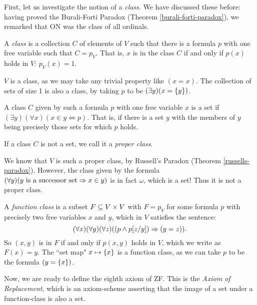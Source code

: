 \documentclass{article}
\begin{document}
First, let us investigate the notion of a \textit{class}. We have discussed these before: having proved the Burali-Forti Paradox (Theorem \ref{burali-forti-paradox}), we remarked that ON was the class of all ordinals.

\begin{definition}[Class]
	A \textit{class} is a collection $C$ of elements of $V$ such that there is a formula $p$ with one free variable such that $C = p_V$. That is, $x$ is in the class $C$ if and only if $p(x)$ holds in $V$: $p_V(x) = 1$.
\end{definition}

\begin{corollary}
    $V$ is a class, as we may take any trivial property like $(x = x)$. The collection of sets of size 1 is also a class, by taking $p$ to be $(\exists y)(x = \left\lbrace y \right\rbrace)$.
\end{corollary}

\begin{definition}
    A class $C$ given by such a formula $p$ with one free variable $x$ is a set if $(\exists y)(\forall x)(x \in y \Leftrightarrow p)$. That is, if there is a set $y$ with the members of $y$ being precisely those sets for which $p$ holds.
	
	If a class $C$ is not a set, we call it a \textit{proper class}.
\end{definition}

\begin{corollary}
    We know that $V$ is such a proper class, by Russell's Paradox (Theorem \ref{russells-paradox}).
	However, the class given by the formula $(\forall y)(y \text{ is a successor set} \Rightarrow x \in y)$ is in fact $\omega$, which is a set! Thus it is not a proper class.
\end{corollary}

\begin{definition}
	\label{function-class}
    A \textit{function class} is a subset $F \subseteq V \times V$ with $F = p_V$ for some formula $p$ with precisely two free variables $x$ and $y$, which in $V$ satisfies the sentence:
    \[
	(\forall x)(\forall y)(\forall z)((p \land p[z/y]) \Rightarrow (y = z)).
	\]
	So $(x, y)$ is in $F$ if and only if $p(x, y)$ holds in $V$, which we write as $F(x) = y$. The ``set map" $x \mapsto \left\lbrace x \right\rbrace$ is a function class, as we can take $p$ to be the formula $(y = \left\lbrace x \right\rbrace)$.
\end{definition}

Now, we are ready to define the eighth axiom of ZF. This is the \textit{Axiom of Replacement}, which is an axiom-scheme asserting that the image of a set under a function-class is also a set.
\end{document}
